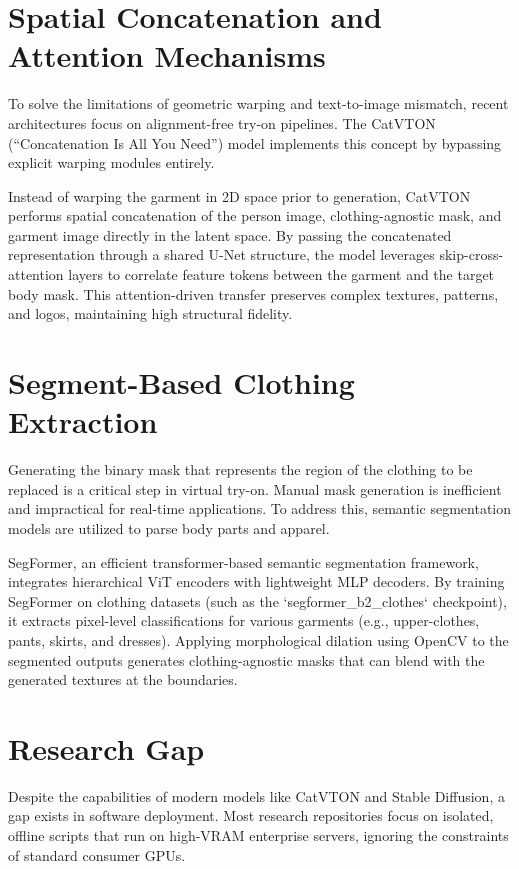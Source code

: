 \documentclass[12pt, a4paper]{report}
\begin{document}
\section{Spatial Concatenation and Attention Mechanisms}

To solve the limitations of geometric warping and text-to-image mismatch, recent architectures focus on alignment-free try-on pipelines. The CatVTON (``Concatenation Is All You Need'') model implements this concept by bypassing explicit warping modules entirely.

Instead of warping the garment in 2D space prior to generation, CatVTON performs spatial concatenation of the person image, clothing-agnostic mask, and garment image directly in the latent space. By passing the concatenated representation through a shared U-Net structure, the model leverages skip-cross-attention layers to correlate feature tokens between the garment and the target body mask. This attention-driven transfer preserves complex textures, patterns, and logos, maintaining high structural fidelity.

\section{Segment-Based Clothing Extraction}

Generating the binary mask that represents the region of the clothing to be replaced is a critical step in virtual try-on. Manual mask generation is inefficient and impractical for real-time applications. To address this, semantic segmentation models are utilized to parse body parts and apparel.

SegFormer, an efficient transformer-based semantic segmentation framework, integrates hierarchical ViT encoders with lightweight MLP decoders. By training SegFormer on clothing datasets (such as the `segformer\_b2\_clothes` checkpoint), it extracts pixel-level classifications for various garments (e.g., upper-clothes, pants, skirts, and dresses). Applying morphological dilation using OpenCV to the segmented outputs generates clothing-agnostic masks that can blend with the generated textures at the boundaries.

\section{Research Gap}

Despite the capabilities of modern models like CatVTON and Stable Diffusion, a gap exists in software deployment. Most research repositories focus on isolated, offline scripts that run on high-VRAM enterprise servers, ignoring the constraints of standard consumer GPUs.
\end{document}

